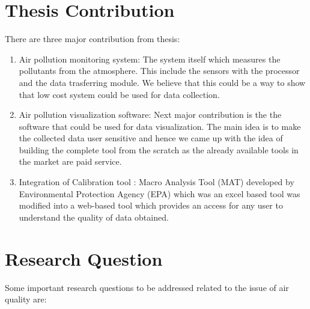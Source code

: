 \section{Thesis Contribution}

There are three major contribution from thesis:
\begin{enumerate}
  
    \item Air pollution monitoring system: The system itself which measures the pollutants from the atmosphere. This include the sensors with the processor and the data trasferring module. We believe that this could be a way to show that low cost system could be used for data collection.
    \item  Air pollution visualization software: Next major contribution is the the software that could be used for data visualization. The main idea is to make the collected data user sensitive and hence we came up with the idea of building the complete tool from the scratch as the already available tools in the market are paid service. 
    \item Integration of Calibration tool :  Macro Analysis Tool (MAT) developed by Environmental Protection Agency (EPA) which was an excel based tool was modified into a web-based tool which provides an access for any user to understand the quality of data obtained.
  
\end{enumerate}


\section{Research Question}
 
 Some important research questions to be addressed related to the issue of air quality are: 

